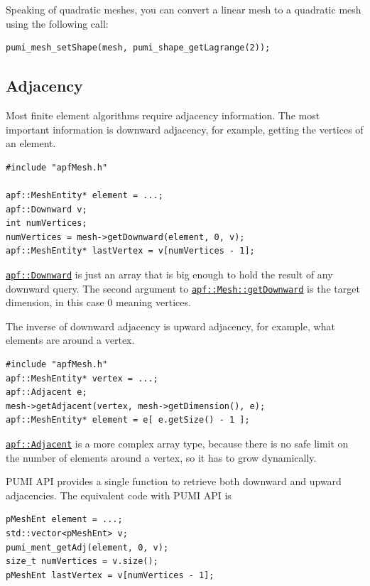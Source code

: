 \documentclass{article}
\begin{document}
{Speaking of quadratic meshes, you can convert a linear mesh
to a quadratic mesh using the following call:

\begin{lstlisting}
pumi_mesh_setShape(mesh, pumi_shape_getLagrange(2));
\end{lstlisting}

\subsection{Adjacency}

Most finite element algorithms require adjacency information.
The most important information is downward adjacency, for
example, getting the vertices of an element.

\begin{lstlisting}
#include "apfMesh.h"

apf::MeshEntity* element = ...;
apf::Downward v;
int numVertices;
numVertices = mesh->getDownward(element, 0, v);
apf::MeshEntity* lastVertex = v[numVertices - 1];
\end{lstlisting}

\href{http://scorec.rpi.edu/~dibanez/core/namespaceapf.html#a041eedcdfef4c64dafb2936219978328}{\texttt{apf::Downward}}
is just an array that is big enough to hold the result of any downward
query.
The second argument to
\href{http://scorec.rpi.edu/~dibanez/core/classapf_1_1Mesh.html#ae9af2075129ffd4553092049d85b276b}{\texttt{apf::Mesh::getDownward}}
is the target dimension, in this case 0 meaning vertices.

The inverse of downward adjacency is upward adjacency,
for example, what elements are around a vertex.

\begin{lstlisting}
#include "apfMesh.h"
apf::MeshEntity* vertex = ...;
apf::Adjacent e;
mesh->getAdjacent(vertex, mesh->getDimension(), e);
apf::MeshEntity* element = e[ e.getSize() - 1 ];
\end{lstlisting}

\href{http://scorec.rpi.edu/~dibanez/core/namespaceapf.html#a12d882b4789bf98322cbe6f02c91b1f8}{\texttt{apf::Adjacent}} is a more complex array type,
because there is no safe limit on the number of elements around
a vertex, so it has to grow dynamically.

PUMI API provides a single function to retrieve both downward and upward adjacencies.
The equivalent code with PUMI API is

\begin{lstlisting}
pMeshEnt element = ...;
std::vector<pMeshEnt> v;
pumi_ment_getAdj(element, 0, v);
size_t numVertices = v.size();
pMeshEnt lastVertex = v[numVertices - 1];


\end{lstlisting}}
\end{document}
